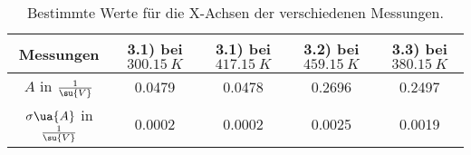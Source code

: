 \begin{table}
  \centering
  \caption{Bestimmte Werte für die X-Achsen der verschiedenen Messungen.}
  \label{tab:Steigungen}
  \begin{tabular}{c | c c c c }
    \toprule
    Messungen & 3.1) bei $\SI{300.15}{K}$ & 3.1) bei $\SI{417.15}{K}$ &
    3.2) bei $\SI{459.15}{K}$ & 3.3) bei $\SI{380.15}{K}$ \\
    \midrule
    $A$ in $\frac{1}{\su{V}}$            & 0.0479 & 0.0478 & 0.2696 & 0.2497 \\
    $\sigma\ua{A}$ in $\frac{1}{\su{V}}$ & 0.0002 & 0.0002 & 0.0025 & 0.0019 \\
  \end{tabular}
\end{table}
